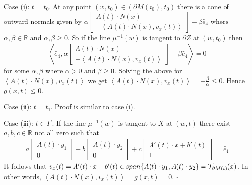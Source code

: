 \documentclass{elsart5p}
\begin{document}
{Case (i): $t=t_0$.  At any point $(w,t_0) \in (\partial M(t_0), t_0)$ there is a cone of outward normals 
given by $\alpha \begin{bmatrix} A(t) \cdot N(x) \\ - \left < A(t) \cdot N(x) , v_x(t)  \right > \end{bmatrix} - \beta \hat{e}_4$ 
where $\alpha, \beta \in \mathbb{R}$ and $\alpha, \beta \geq 0$.  So if the line $\mu^{-1}(w)$ is tangent to $\partial Z$ at $(w,t_0)$ then 
\begin{align*}
\left <  \hat{e}_4,  \alpha \begin{bmatrix} A(t) \cdot N(x) \\ - \left < A(t) \cdot N(x) ,v_x(t)  \right > \end{bmatrix} - \beta \hat{e}_4 \right > = 0
\end{align*}
for some $\alpha, \beta$ where $\alpha > 0$ and $\beta \geq 0$.  Solving the above for $ \left < A(t) \cdot N(x) ,v_x(t)  \right >$ we get $ \left < A(t) \cdot N(x) ,v_x(t)  \right > = - \frac{\beta}{\alpha} \leq 0$.
Hence $g(x,t) \leq 0$.

Case (ii): $t = t_1$.  Proof is similar to case (i).

Case (iii): $t \in I^o$. If the line $\mu^{-1}(w)$ is 
tangent to $X$ at $(w,t)$ there exist $a,b,c \in \mathbb{R}$ not all zero such that 
\begin{align*}
a \begin{bmatrix} A(t) \cdot y_1 \\ 0 \end{bmatrix} + b \begin{bmatrix} A(t) \cdot y_2  \\ 0 \end{bmatrix} + c \begin{bmatrix} A'(t) \cdot x + b'(t) \\ 1 \end{bmatrix} = \hat{e}_4
\end{align*}
It follows that $v_x(t) = A'(t) \cdot x + b'(t) \in span\{ A(t) \cdot y_1,  A(t) \cdot y_2 \} = {\cal T}_{\partial M(t)}(x)$.  
In other words, $\left < A(t) \cdot N(x), v_x(t) \right > = g(x, t) = 0$.
\hfill $\square$
}
\end{document}
